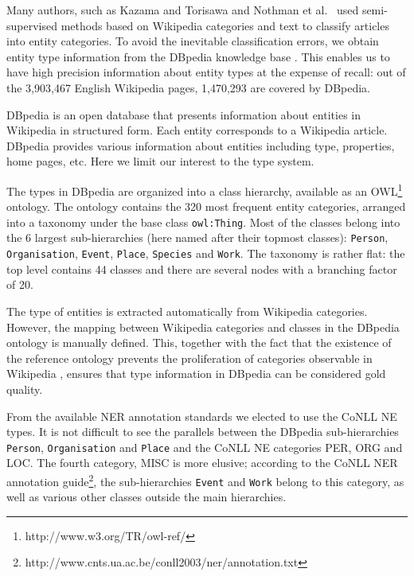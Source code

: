 \documentclass[11pt]{article}
\begin{document}
Many authors, such as Kazama and Torisawa  and Nothman et al.~ used semi-supervised methods based on Wikipedia categories and text to classify articles into entity categories. To avoid the inevitable classification errors, we obtain entity type information from the DBpedia knowledge base \cite{Bizer:09}. This enables us to have high precision information about entity types at the expense of recall: out of the 3,903,467 English Wikipedia pages, 1,470,293 are covered by DBpedia.

DBpedia is an open database that presents information about entities in Wikipedia in structured form. Each entity corresponds to a Wikipedia article. DBpedia provides various information about entities including type, properties, home pages, etc. Here we limit our interest to the type system.

The types in DBpedia are organized into a class hierarchy, available as an OWL\footnote{http://www.w3.org/TR/owl-ref/} ontology. The ontology contains the 320 most frequent entity categories, arranged into a taxonomy under the base class \texttt{owl:Thing}. Most of the classes belong into the 6 largest sub-hierarchies (here named after their topmost classes): \texttt{Person}, \texttt{Organisation}, \texttt{Event}, \texttt{Place}, \texttt{Species} and \texttt{Work}. The taxonomy is rather flat: the top level contains 44 classes and there are several nodes with a branching factor of 20.

The type of entities is extracted automatically from Wikipedia categories. However, the mapping between Wikipedia categories and classes in the DBpedia ontology is manually defined. This, together with the fact that the existence of the reference ontology prevents the proliferation of categories observable in Wikipedia \cite{Bizer:09}, ensures that type information in DBpedia can be considered gold quality.

From the available NER annotation standards we elected to use the CoNLL \cite{Tjong:03} NE types. It is not difficult to see the parallels between the DBpedia sub-hierarchies \texttt{Person}, \texttt{Organisation} and \texttt{Place} and the CoNLL NE categories PER, ORG and LOC. The fourth category, MISC is more elusive; according to the CoNLL NER annotation guide\footnote{http://www.cnts.ua.ac.be/conll2003/ner/annotation.txt}, the sub-hierarchies \texttt{Event} and \texttt{Work} belong to this category, as well as various other classes outside the main hierarchies. 
\end{document}
